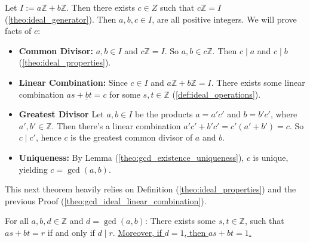 \begin{Proof}

    \label{proof:gcd_ideal_linear_combination}

    Let $I:=a\mathbb{Z} + b\mathbb{Z}$. Then there exists $c\in Z$ such that $c\mathbb{Z} = I$ (\ref{theo:ideal_generator}). Then $a,b,c\in I$, are all
    positive integers. We will prove facts of $c$:
    \begin{itemize}
        \item \textbf{Common Divisor: }$a,b\in I$ and $c\mathbb{Z}=I$. So $a,b\in c\mathbb{Z}$. Then $c\mid a$ and $c\mid b$ (\ref{theo:ideal_properties}).
        \item \textbf{Linear Combination:} Since $c\in I$ and $a\mathbb{Z} + b\mathbb{Z} = I$. There exists some linear combination $\underline{as+bt=c}$ for some $s,t\in\mathbb{Z}$ (\ref{def:ideal_operations}).
        \item \textbf{Greatest Divisor} Let $a,b\in I$ be the products $a=a'c'$ and $b=b'c'$, where $a',b'\in\mathbb{Z}$.
              Then there's a linear combination $a'c'+b'c'=c'(a'+b')=c$. So $c\mid c'$, hence $c$ is the greatest common divisor of $a$ and $b$.
        \item \textbf{Uniqueness:} By Lemma (\ref{theo:gcd_existence_uniqueness}), $c$ is unique, yielding $c=\gcd(a,b)$.
    \end{itemize}
\end{Proof}

\newpage

\noindent
This next theorem heavily relies on Definition (\ref{theo:ideal_properties}) and the previous Proof (\ref{theo:gcd_ideal_linear_combination}).
\begin{theo}

    \label{theo:element_linear_combinations}
    \label{theo:bezouts_identity}

    For all \(a, b,d \in \mathbb{Z}\) and $d=\gcd(a,b)$: There exists some \(s, t \in \mathbb{Z}\), such that \(as + bt = r\) if and only if $d\mid r$.
    \underline{Moreover, if $d=1$, then $as+bt=1$.}
        
\end{theo}


